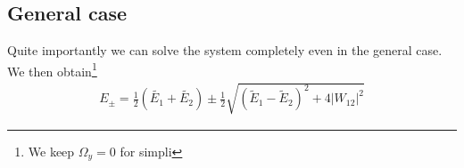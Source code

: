 \subsection{General case}

Quite importantly we can solve the system completely even in the general case. We then obtain\footnote{We keep $\Omega_y =0$ for simpli}
\begin{align}\label{eq:Epm}
 E_\pm = \frac{1}{2}\left(\tilde{E_1}+\tilde{E_2}\right) \pm \frac{1}{2} \sqrt{\left(\tilde{E}_1-\tilde{E}_2\right)^2+4 \left|W_{12}\right|^2}
\end{align}